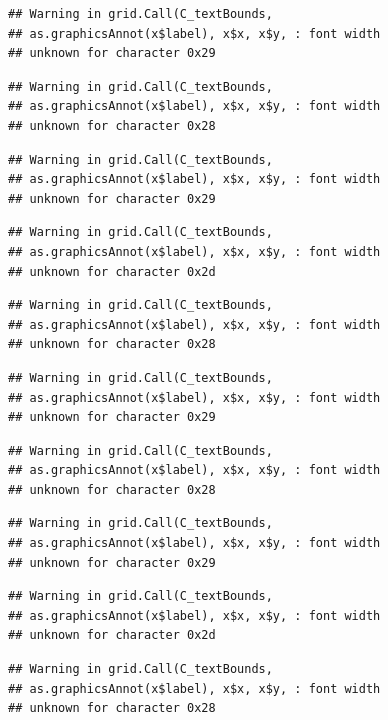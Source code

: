 \documentclass[
]{book}
\begin{document}
\begin{verbatim}
## Warning in grid.Call(C_textBounds,
## as.graphicsAnnot(x$label), x$x, x$y, : font width
## unknown for character 0x29
\end{verbatim}

\begin{verbatim}
## Warning in grid.Call(C_textBounds,
## as.graphicsAnnot(x$label), x$x, x$y, : font width
## unknown for character 0x28
\end{verbatim}

\begin{verbatim}
## Warning in grid.Call(C_textBounds,
## as.graphicsAnnot(x$label), x$x, x$y, : font width
## unknown for character 0x29
\end{verbatim}

\begin{verbatim}
## Warning in grid.Call(C_textBounds,
## as.graphicsAnnot(x$label), x$x, x$y, : font width
## unknown for character 0x2d
\end{verbatim}

\begin{verbatim}
## Warning in grid.Call(C_textBounds,
## as.graphicsAnnot(x$label), x$x, x$y, : font width
## unknown for character 0x28
\end{verbatim}

\begin{verbatim}
## Warning in grid.Call(C_textBounds,
## as.graphicsAnnot(x$label), x$x, x$y, : font width
## unknown for character 0x29
\end{verbatim}

\begin{verbatim}
## Warning in grid.Call(C_textBounds,
## as.graphicsAnnot(x$label), x$x, x$y, : font width
## unknown for character 0x28
\end{verbatim}

\begin{verbatim}
## Warning in grid.Call(C_textBounds,
## as.graphicsAnnot(x$label), x$x, x$y, : font width
## unknown for character 0x29
\end{verbatim}

\begin{verbatim}
## Warning in grid.Call(C_textBounds,
## as.graphicsAnnot(x$label), x$x, x$y, : font width
## unknown for character 0x2d
\end{verbatim}

\begin{verbatim}
## Warning in grid.Call(C_textBounds,
## as.graphicsAnnot(x$label), x$x, x$y, : font width
## unknown for character 0x28
\end{verbatim}
\end{document}
